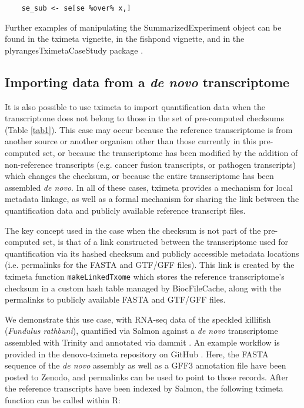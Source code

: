 \documentclass[12pt]{article} \usepackage[utf8]{inputenc}
\begin{document}
\begin{verbatim}
    se_sub <- se[se %over% x,]
\end{verbatim}

Further examples of manipulating the SummarizedExperiment object can
be found in the tximeta vignette, in the fishpond vignette, and in the
plyrangesTximetaCaseStudy package \citep{casestudy}.

\subsection*{Importing data from a \textit{de novo} transcriptome}

It is also possible to use tximeta to import quantification data when
the transcriptome does not belong to those in the set of pre-computed
checksums (Table \ref{tab1}). This case may occur because the
reference transcriptome is from another source or another organism
other than those currently in this pre-computed set, or because the
transcriptome has been modified by the addition of non-reference
transcripts (e.g. cancer fusion transcripts, or pathogen transcripts)
which changes the checksum, or because the entire transcriptome has
been assembled \textit{de novo}. In all of these cases, tximeta
provides a mechanism for local metadata linkage, as well as a formal
mechanism for sharing the link between the quantification data and
publicly available reference transcript files.

The key concept used in the case when the checksum is not part of the
pre-computed set, is that of a link constructed between the
transcriptome used for quantification via its hashed checksum and
publicly accessible metadata locations (i.e. permalinks for the FASTA
and GTF/GFF files). This link is created by the tximeta function
\texttt{makeLinkedTxome} which stores the reference transcriptome's
checksum in a custom hash table managed by BiocFileCache, along with
the permalinks to publicly available FASTA and GTF/GFF files.

We demonstrate this use case, with RNA-seq data of the speckled
killifish (\textit{Fundulus rathbuni}), quantified via Salmon
\citep{salmon} against a \textit{de novo} transcriptome assembled with
Trinity \citep{trinity} and annotated via dammit \citep{dammit}. An
example workflow is provided in the denovo-tximeta repository on
GitHub \citep{denovo}. Here, the FASTA sequence of the \textit{de
  novo} assembly as well as a GFF3 annotation file have been posted to
Zenodo, and permalinks can be used to point to those records. After
the reference transcripts have been indexed by Salmon, the following
tximeta function can be called within R:
\end{document}
